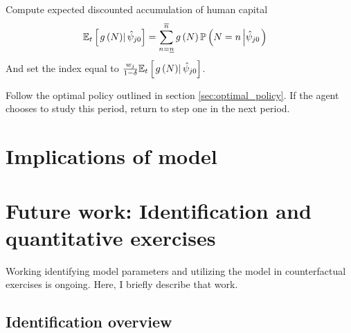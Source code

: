 \documentclass[11 pt]{article}
\newcommand{\pr}[1]{\left( #1 \right)}
\newcommand{\ce}[2]{\left[\left. #1 \right\vert #2 \right]}
\newcommand{\crs}[2]{#1 \left\vert #2 \right.}
\begin{document}
\begin{outline}
\item Compute expected discounted accumulation of human capital
\begin{align*}
    \EE_t \ce{
        g\pr{N}
    }{\hat{\psi}_{j0}} 
    &=
    \sum_{n = \underline{n}}^{\overline{n}}
    g\pr{N}
    \mathbb{P}
    \pr{\crs{
        N = n
    }{\hat{\psi}_{j0}}
    }
\end{align*}
And set the index equal to $\frac{w_j}{1 - \delta} \EE_t \ce{g\pr{N}}{\hat{\psi}_{j0}} $.

\item Follow the optimal policy outlined in section \ref{sec:optimal_policy}. If the agent chooses to study this period, return to step one in the next period. 

\end{outline}



\section{Implications of model}\label{sec:sims}



\section{Future work: Identification and quantitative exercises}\label{sec:identification}

Working identifying model parameters and utilizing the model in counterfactual exercises is ongoing.
Here, I briefly describe that work.

\subsection{Identification overview}
\end{document}

